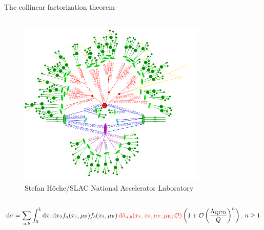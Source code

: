 \begin{frame} {The collinear factorization theorem}
\begin{columns}
    \begin{column}{0.4\textwidth}
       \begin{figure}
        \centering
        \includegraphics[width=0.8\textwidth]{imgs/hadron-collision.png}
        \caption{Stefan Höche/SLAC National Accelerator Laboratory}
      \end{figure}
    
    \end{column}

    \end{columns}
    \begin{equation*}
    \text{d}\sigma=\sum_{a, b} \int_0^1 \text{d}x_1 \text{d}x_2 f_{a}(x_1, \mu_\text{F}) f_{b}(x_2,\mu_\text{F}) \, \textcolor{red}{\text{d}\hat \sigma_{a,b}(x_1,x_2,\mu_\text{F},\mu_\text{R};\mathcal{O})} \left(1+ \mathcal{O}\left(\frac{\Lambda_{\text{QCD}}}{Q} \right)^n \right), \, n\geq1
    \label{fact-theor}
\end{equation*}
  
\end{frame}



